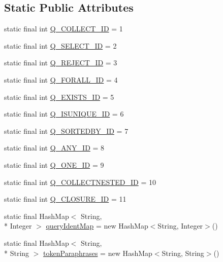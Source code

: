 \subsection*{Static Public Attributes}
\begin{DoxyCompactItemize}
\item 
static final int \hyperlink{classorg_1_1tzi_1_1use_1_1parser_1_1base_1_1_parser_helper_acaae9c7d25a2746cff3b9b55217a5dda}{Q\-\_\-\-C\-O\-L\-L\-E\-C\-T\-\_\-\-I\-D} = 1
\item 
static final int \hyperlink{classorg_1_1tzi_1_1use_1_1parser_1_1base_1_1_parser_helper_a69a8d59ce3fbbf1e6de8a63e92820bd2}{Q\-\_\-\-S\-E\-L\-E\-C\-T\-\_\-\-I\-D} = 2
\item 
static final int \hyperlink{classorg_1_1tzi_1_1use_1_1parser_1_1base_1_1_parser_helper_a7091aba60c5731b3fdf4950ca77b8b40}{Q\-\_\-\-R\-E\-J\-E\-C\-T\-\_\-\-I\-D} = 3
\item 
static final int \hyperlink{classorg_1_1tzi_1_1use_1_1parser_1_1base_1_1_parser_helper_aacc04cabf8b2e7c5312d179f019fcf6c}{Q\-\_\-\-F\-O\-R\-A\-L\-L\-\_\-\-I\-D} = 4
\item 
static final int \hyperlink{classorg_1_1tzi_1_1use_1_1parser_1_1base_1_1_parser_helper_ab2b4ff4bcfc6604aa95551179da3d916}{Q\-\_\-\-E\-X\-I\-S\-T\-S\-\_\-\-I\-D} = 5
\item 
static final int \hyperlink{classorg_1_1tzi_1_1use_1_1parser_1_1base_1_1_parser_helper_a32461b1a5584d929b58ef62e1d65912c}{Q\-\_\-\-I\-S\-U\-N\-I\-Q\-U\-E\-\_\-\-I\-D} = 6
\item 
static final int \hyperlink{classorg_1_1tzi_1_1use_1_1parser_1_1base_1_1_parser_helper_a1667f5183da22609d0f80865967c451e}{Q\-\_\-\-S\-O\-R\-T\-E\-D\-B\-Y\-\_\-\-I\-D} = 7
\item 
static final int \hyperlink{classorg_1_1tzi_1_1use_1_1parser_1_1base_1_1_parser_helper_a623adb6bad0f14c987ec58ffee9d34e8}{Q\-\_\-\-A\-N\-Y\-\_\-\-I\-D} = 8
\item 
static final int \hyperlink{classorg_1_1tzi_1_1use_1_1parser_1_1base_1_1_parser_helper_ab066a726fe60df93840a3ae510916bdb}{Q\-\_\-\-O\-N\-E\-\_\-\-I\-D} = 9
\item 
static final int \hyperlink{classorg_1_1tzi_1_1use_1_1parser_1_1base_1_1_parser_helper_a312763638e214da41d6d9acfda182932}{Q\-\_\-\-C\-O\-L\-L\-E\-C\-T\-N\-E\-S\-T\-E\-D\-\_\-\-I\-D} = 10
\item 
static final int \hyperlink{classorg_1_1tzi_1_1use_1_1parser_1_1base_1_1_parser_helper_a42cb2847048cb6693f5d958781ca1ab9}{Q\-\_\-\-C\-L\-O\-S\-U\-R\-E\-\_\-\-I\-D} = 11
\item 
static final Hash\-Map$<$ String, \\*
Integer $>$ \hyperlink{classorg_1_1tzi_1_1use_1_1parser_1_1base_1_1_parser_helper_a4c76a429f63273d979eae9c33c43ecb4}{query\-Ident\-Map} = new Hash\-Map$<$String, Integer$>$()
\item 
static final Hash\-Map$<$ String, \\*
String $>$ \hyperlink{classorg_1_1tzi_1_1use_1_1parser_1_1base_1_1_parser_helper_a96977066b217274e493f569236081f42}{token\-Paraphrases} = new Hash\-Map$<$String, String$>$()
\end{DoxyCompactItemize}


